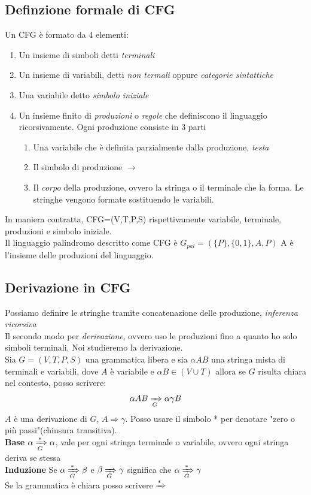 \documentclass[12pt]{article}
\begin{document}
\newpage
\subsection{Definzione formale di CFG}
Un CFG è formato da 4 elementi: 
\begin{enumerate}
  \item Un insieme di simboli detti \emph{terminali}
  \item Un insieme di variabili, detti \emph{non termali} oppure \emph{categorie sintattiche}
  \item Una variabile detto \emph{simbolo iniziale}
  \item Un insieme finito di \emph{produzioni} o \emph{regole} che definiscono il linguaggio ricorsivamente. Ogni produzione consiste in 3 parti 
    \begin{enumerate}
      \item Una variabile che è definita parzialmente dalla produzione, \emph{testa}
      \item Il simbolo di produzione $\rightarrow$
      \item Il \emph{corpo} della produzione, ovvero la stringa o il terminale che la forma. Le stringhe vengono formate sostituendo le variabili.
    \end{enumerate}
\end{enumerate}
In maniera contratta, CFG=(V,T,P,S) rispettivamente variabile, terminale, produzioni e simbolo iniziale. 
\\ Il linguaggio palindromo descritto come CFG è $G_{pal}=(\{P\}, \{0,1\},A,P)$ A è l'insieme delle produzioni del linguaggio.

\subsection{Derivazione in CFG}
Possiamo definire le stringhe tramite concatenazione delle produzione, \emph{inferenza ricorsiva} 
\\ Il secondo modo per \emph{derivazione}, ovvero uso le produzioni fino a quanto ho solo simboli terminali. Noi studieremo la derivazione.
\\ Sia $G=(V,T,P,S)$ una grammatica libera e sia $\alpha AB$ una stringa mista di terminali e variabili, dove $A$ è variabile e $\alpha B \in (V \cup T)$ allora se $G$ risulta chiara nel contesto, posso scrivere: 
\[\alpha A B \xRightarrow[G] \; \alpha \gamma B\]
$A$ è una derivazione di $G$, $A \Rightarrow \gamma $. Posso usare il simbolo * per denotare "zero o più passi"(chiusura transitiva). 
\\ \textbf{Base} $\alpha \xRightarrow[G]{*} \alpha$, vale per ogni stringa terminale o variabile, ovvero ogni stringa deriva se stessa 
\\ \textbf{Induzione} Se $\alpha \xRightarrow[G]{*} \beta$ e $\beta \xRightarrow[G]{} \gamma$ significa che $\alpha \xRightarrow[G]{*} \gamma$
\\ Se la grammatica è chiara posso scrivere $\xRightarrow{*}$
\end{document}
